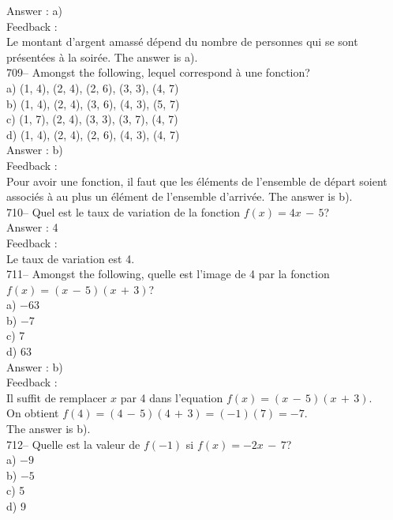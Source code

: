 \documentclass[letterpaper, 12pt]{article}
\begin{document}
Answer :  a)\\

Feedback :  \\
Le montant d'argent amass\'e d\'epend du nombre de personnes qui se sont
pr\'esent\'ees \`a la soir\'ee.  The answer is a).\\

709-- Amongst the following, lequel correspond \`a une fonction?\\
a) {(1, 4), (2, 4), (2, 6), (3, 3), (4, 7)}\\
b) {(1, 4), (2, 4), (3, 6), (4, 3), (5, 7)}\\
c) {(1, 7), (2, 4), (3, 3), (3, 7), (4, 7)}\\
d) {(1, 4), (2, 4), (2, 6), (4, 3), (4, 7)}\\

Answer :  b)\\

Feedback :  \\
Pour avoir une fonction, il faut que  les \'el\'ements de l'ensemble de
d\'epart soient associ\'es \`a au plus un \'el\'ement de l'ensemble
d'arriv\'ee.  The answer is b).\\

710-- Quel est le taux de variation de la fonction $f(x)=4x\,-\,5$?\\

Answer :  4\\

Feedback :  \\
Le taux de variation est 4.\\

711-- Amongst the following, quelle est l'image de 4 par la
fonction $f(x)=(x\,-\,5)(x\,+\,3)$?\\
a) $-63$\\
b) $-7$\\
c) 7\\
d) 63\\

Answer : b)\\

Feedback : \\
Il suffit de remplacer $x$ par 4 dans l'equation
$f(x)=(x\,-\,5)(x\,+\,3)$.\\
On obtient $f(4)=(4\,-\,5)(4\,+\,3)=(-1)(7)=-7$.\\
The answer is b).\\

712-- Quelle est la valeur de $f(-1)$ si $f(x)=-2x\,-\,7$?\\
a) $-9$\\
b) $-5$\\
c) 5\\
d) 9\\
\end{document}
